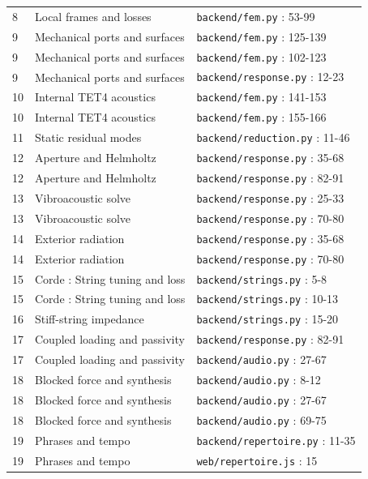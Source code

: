 \documentclass[10pt,a4paper]{article}
\begin{document}
\begin{longtable}{p{8mm}p{75mm}p{65mm}}
8 & Local frames and losses & \texttt{backend/fem.py} : 53-99\\[3pt]
9 & Mechanical ports and surfaces & \texttt{backend/fem.py} : 125-139\\[3pt]
9 & Mechanical ports and surfaces & \texttt{backend/fem.py} : 102-123\\[3pt]
9 & Mechanical ports and surfaces & \texttt{backend/response.py} : 12-23\\[3pt]
10 & Internal TET4 acoustics & \texttt{backend/fem.py} : 141-153\\[3pt]
10 & Internal TET4 acoustics & \texttt{backend/fem.py} : 155-166\\[3pt]
11 & Static residual modes & \texttt{backend/reduction.py} : 11-46\\[3pt]
12 & Aperture and Helmholtz & \texttt{backend/response.py} : 35-68\\[3pt]
12 & Aperture and Helmholtz & \texttt{backend/response.py} : 82-91\\[3pt]
13 & Vibroacoustic solve & \texttt{backend/response.py} : 25-33\\[3pt]
13 & Vibroacoustic solve & \texttt{backend/response.py} : 70-80\\[3pt]
14 & Exterior radiation & \texttt{backend/response.py} : 35-68\\[3pt]
14 & Exterior radiation & \texttt{backend/response.py} : 70-80\\[3pt]
15 & Corde : String tuning and loss & \texttt{backend/strings.py} : 5-8\\[3pt]
15 & Corde : String tuning and loss & \texttt{backend/strings.py} : 10-13\\[3pt]
16 & Stiff-string impedance & \texttt{backend/strings.py} : 15-20\\[3pt]
17 & Coupled loading and passivity & \texttt{backend/response.py} : 82-91\\[3pt]
17 & Coupled loading and passivity & \texttt{backend/audio.py} : 27-67\\[3pt]
18 & Blocked force and synthesis & \texttt{backend/audio.py} : 8-12\\[3pt]
18 & Blocked force and synthesis & \texttt{backend/audio.py} : 27-67\\[3pt]
18 & Blocked force and synthesis & \texttt{backend/audio.py} : 69-75\\[3pt]
19 & Phrases and tempo & \texttt{backend/repertoire.py} : 11-35\\[3pt]
19 & Phrases and tempo & \texttt{web/repertoire.js} : 15\\[3pt]

\end{longtable}
\end{document}
